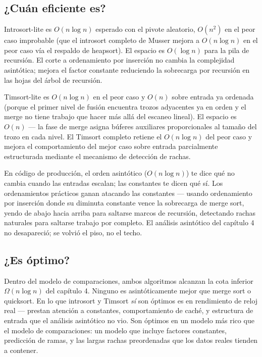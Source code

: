\documentclass[11pt,a4paper]{article}
\begin{document}
\subsection*{¿Cuán eficiente es?}

Introsort-lite es $O(n \log n)$ esperado con el pivote aleatorio, $O(n^2)$ en el peor caso improbable (que el introsort completo de Musser mejora a $O(n \log n)$ en el peor caso vía el respaldo de heapsort). El espacio es $O(\log n)$ para la pila de recursión. El corte a ordenamiento por inserción no cambia la complejidad asintótica; mejora el factor constante reduciendo la sobrecarga por recursión en las hojas del árbol de recursión.

Timsort-lite es $O(n \log n)$ en el peor caso y $O(n)$ sobre entrada ya ordenada (porque el primer nivel de fusión encuentra trozos adyacentes ya en orden y el merge no tiene trabajo que hacer más allá del escaneo lineal). El espacio es $O(n)$ --- la fase de merge asigna búferes auxiliares proporcionales al tamaño del trozo en cada nivel. El Timsort completo retiene el $O(n \log n)$ del peor caso y mejora el comportamiento del mejor caso sobre entrada parcialmente estructurada mediante el mecanismo de detección de rachas.

En código de producción, el orden asintótico ($O(n \log n)$) te dice qué no cambia cuando las entradas escalan; las constantes te dicen qué sí. Los ordenamientos prácticos ganan atacando las constantes --- usando ordenamiento por inserción donde su diminuta constante vence la sobrecarga de merge sort, yendo de abajo hacia arriba para saltarse marcos de recursión, detectando rachas naturales para saltarse trabajo por completo. El análisis asintótico del capítulo 4 no desapareció; se volvió el piso, no el techo.

\subsection*{¿Es óptimo?}

Dentro del modelo de comparaciones, ambos algoritmos alcanzan la cota inferior $\Omega(n \log n)$ del capítulo 4. Ninguno es asintóticamente mejor que merge sort o quicksort. En lo que introsort y Timsort \emph{sí} son óptimos es en rendimiento de reloj real --- prestan atención a constantes, comportamiento de caché, y estructura de entrada que el análisis asintótico no vio. Son óptimos en un modelo más rico que el modelo de comparaciones: un modelo que incluye factores constantes, predicción de ramas, y las largas rachas preordenadas que los datos reales tienden a contener.
\end{document}
